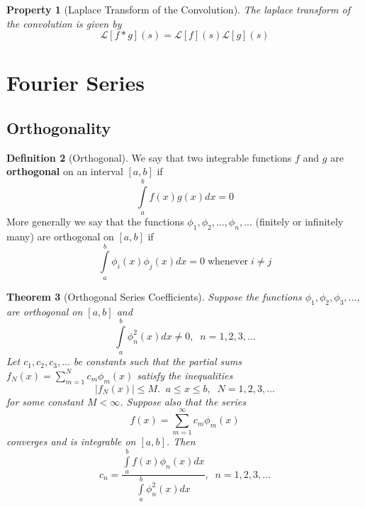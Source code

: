 \documentclass[12pt]{article}
\newtheorem{thm}{Theorem}[section]
\newtheorem{pro}[thm]{Property}
\theoremstyle{definition}
\newtheorem{defn}[thm]{Definition}
\theoremstyle{remark}
\numberwithin{equation}{section}
\newcommand\B[1]{\textbf{ #1}}
\begin{document}
\vspace{1cm}


\begin{pro}[Laplace Transform of the Convolution]
        The laplace transform of the convolution is given by \begin{equation}
                \mathcal{L}[f*g](s) = \mathcal{L}[f](s)\mathcal{L}[g](s)
        \end{equation}
\end{pro}




\clearpage

\section{Fourier Series}


\subsection{Orthogonality}

\begin{defn}[Orthogonal]
        We say that two integrable functions $f$ and $g$ are \B{orthogonal} on an interval $[a,b]$ if \begin{equation}
                \int\limits_a^bf(x)g(x)dx = 0
        \end{equation}
        More generally we say that the functions $\phi_1,\phi_2,...,\phi_n,...$ (finitely or infinitely many) are orthogonal on $[a,b]$ if \begin{equation}
                \int\limits_a^b\phi_i(x)\phi_j(x)dx = 0\;\text{whenever}\;i\neq j
        \end{equation}
\end{defn}


\vspace{1cm}


\begin{thm}[Orthogonal Series Coefficients]
        Suppose the functions $\phi_1,\phi_2,\phi_3,...$, are orthogonal on $[a,b]$ and \begin{equation}
                \int\limits_a^b\phi_n^2(x)dx \neq 0,\;\;n=1,2,3,...
        \end{equation}
        Let $c_1,c_2,c_3,...$ be constants such that the partial sums $f_N(x) = \sum_{m=1}^Nc_m\phi_m(x)$ satisfy the inequalities \begin{equation}
                |f_N(x)| \leq M.\;\;a \leq x \leq b,\;\;N=1,2,3,...
        \end{equation}
        for some constant $M < \infty$. Suppose also that the series \begin{equation}
                f(x) = \sum\limits_{m=1}^{\infty}c_m\phi_m(x)
        \end{equation}
        converges and is integrable on $[a,b]$. Then \begin{equation}
                c_n = \frac{\int\limits_a^bf(x)\phi_n(x)dx}{\int\limits_a^b\phi_n^2(x)dx},\;\;n=1,2,3,...
        \end{equation}
\end{thm}
\end{document}
